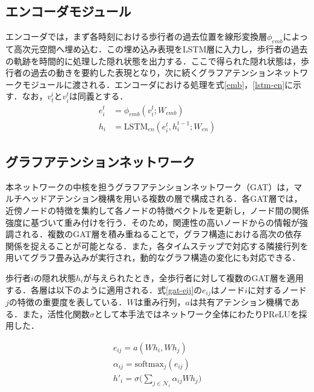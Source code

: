 
\subsection{エンコーダモジュール}
エンコーダでは，まず各時刻における歩行者の過去位置を線形変換層$\phi_{emb}$によって高次元空間へ埋め込む．この埋め込み表現をLSTM層に入力し，歩行者の過去の軌跡を時間的に処理した隠れ状態を出力する．ここで得られた隠れ状態は，歩行者の過去の動きを要約した表現となり，次に続くグラフアテンションネットワークモジュールに渡される．エンコーダにおける処理を式\eqref{emb}，\eqref{lstm-en}に示す．なお，$v^i_t \text{と} v^t_i$は同義とする．
\begin{align}
  e^t_i &= \phi_{emb}(v^t_i ; W_{emb}) \label{emb} \\
  h_i &= \text{LSTM}_{en}(e^t_i, h^{t-1}_i ; W_{en}) \label{lstm-en}
\end{align}

\subsection{グラフアテンションネットワーク}
本ネットワークの中核を担うグラフアテンションネットワーク（GAT）\cite{velickovic2017graph-gat}は，マルチヘッドアテンション機構を用いる複数の層で構成される．各GAT層では，近傍ノードの特徴を集約して各ノードの特徴ベクトルを更新し，ノード間の関係強度に基づいて重み付けを行う．そのため，関連性の高いノードからの情報が強調される．複数のGAT層を積み重ねることで，グラフ構造における高次の依存関係を捉えることが可能となる．また，各タイムステップで対応する隣接行列を用いてグラフ畳み込みが実行され，動的なグラフ構造の変化にも対応できる．

歩行者$i$の隠れ状態$h_i$が与えられたとき，全歩行者に対して複数のGAT層を適用する．各層は以下のように適用される．式\eqref{gat-eij}の$e_{ij}$はノード$i$に対するノード$j$の特徴の重要度を表している．$W$は重み行列，$a$は共有アテンション機構である．また，活性化関数$\sigma$として本手法ではネットワーク全体にわたりPReLU\cite{he2015delving-prelu}を採用した．

\begin{align}
  e_{ij} = a(Wh_i, Wh_j) \label{gat-eij} \\
  \alpha_{ij} = \text{softmax}_{j}(e_{ij}) \\
  h'_i = \sigma\Bigg(\sum_{j \in \mathcal{N}_i} \alpha_{ij}Wh_j \Bigg)
\end{align}

